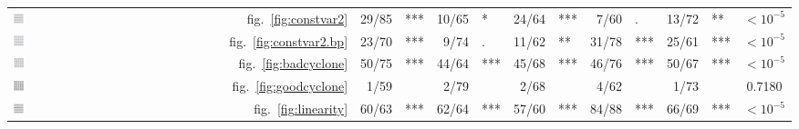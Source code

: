 \documentclass[12pt]{article} %
\begin{document}
\begin{table}[ht]
\begin{tabular}{Mrrlrlrlrlrlc}
\includegraphics[width=0.05\textwidth]{dialyzerheterogeneous-icon}& fig.~\ref{fig:constvar2} & 29/85&\hspace{-0.1in}***  & 10/65&\hspace{-0.1in}* & 24/64&\hspace{-0.1in}*** & 7/60&\hspace{-0.1in}. & 13/72&\hspace{-0.1in}** & $<10^{-5}$\\ 
\includegraphics[width=0.05\textwidth]{dialyzerheterogeneous-bp} &  fig.~\ref{fig:constvar2.bp} & 23/70 & \hspace{-0.1in}*** & 9/74 & \hspace{-0.1in}. & 11/62 & \hspace{-0.1in}** & 31/78 & \hspace{-0.1in}*** & 25/61 & \hspace{-0.1in}*** & $<10^{-5}$\\ 
%
\includegraphics[width=0.05\textwidth]{cyclone-icon}&   fig.~\ref{fig:badcyclone} & 50/75&\hspace{-0.1in}***  & 44/64&\hspace{-0.1in}*** & 45/68&\hspace{-0.1in}*** & 46/76&\hspace{-0.1in}*** & 50/67&\hspace{-0.1in}*** & $<10^{-5}$\\ 
\includegraphics[width=0.05\textwidth]{cyclone-good-icon} & fig.~\ref{fig:goodcyclone}  & 1/59 & \hspace{-0.1in}  & 2/79 & \hspace{-0.1in}  & 2/68 & \hspace{-0.1in}  & 4/62 & \hspace{-0.1in}  & 1/73 & \hspace{-0.1in}  & 0.7180\\ 
%
\includegraphics[width=0.05\textwidth]{dialyzernonlinear-icon}&   fig.~\ref{fig:linearity} & 60/63&\hspace{-0.1in}***  & 62/64&\hspace{-0.1in}*** & 57/60&\hspace{-0.1in}*** & 84/88&\hspace{-0.1in}*** & 66/69&\hspace{-0.1in}*** & $<10^{-5}$\\ 

\end{tabular}
\end{table}
\end{document}
